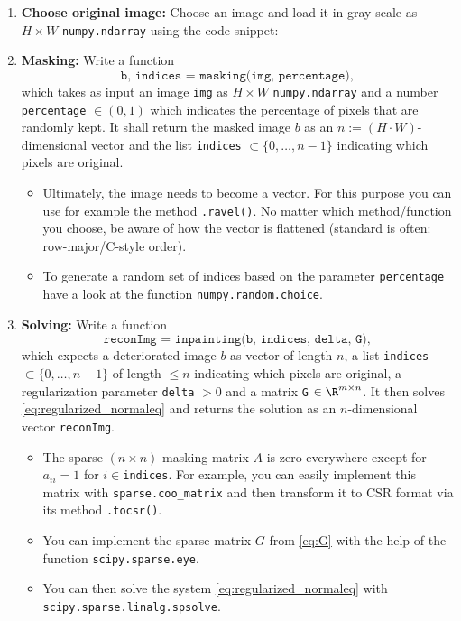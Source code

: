 \begin{enumerate}
	\item \textbf{Choose original image:} Choose an image and load it in gray-scale as $H\times W$ \texttt{numpy.ndarray} using the code snippet:
	
	\item \textbf{Masking:} Write a function 
	$$\texttt{b, indices = masking(img, percentage)},$$
	which takes as input an image \texttt{img} as $H\times W$ \texttt{numpy.ndarray} and a number \texttt{percentage} $\in (0,1)$ which indicates the percentage of pixels that are randomly kept. It shall return the masked image $b$ as an $n:=(H\cdot W)$-dimensional vector and the list \texttt{indices} $\subset \{0,\ldots, n-1\}$ indicating which pixels are original.
	\begin{itemize}
		\item Ultimately, the image needs to become a vector. For this purpose you can use for example the method \texttt{.ravel()}. No matter which method/function you choose, be aware of how the vector is flattened (standard is often: row-major/C-style order).
		\item To generate a random set of indices based on the parameter \texttt{percentage} have a look at the function \texttt{numpy.random.choice}.
	\end{itemize}
	\item \textbf{Solving:} Write a function 
	 $$\texttt{reconImg = inpainting(b, indices, delta, G)},$$
	 which expects a deteriorated image $b$ as vector of length $n$, a list \texttt{indices} $\subset \{0,\ldots, n-1\}$ of length $\leq n$ indicating which pixels are original, a regularization parameter \texttt{delta} $>0$ and a matrix \texttt{G} $\in \R^{m\times n}$. It then solves \eqref{eq:regularized_normaleq} and returns the solution as an $n$-dimensional vector \texttt{reconImg}.
	 \begin{itemize}
	 	\item The sparse  $(n \times n)$ masking matrix $A$ is zero everywhere except for $a_{ii} = 1$ for $i \in$\texttt{indices}. For example, you can easily implement this matrix with  \texttt{sparse.coo\_matrix} and then transform it to CSR format via its method \texttt{.tocsr()}.
	 	\item You can implement the sparse matrix $G$ from \eqref{eq:G} with the help of the function \texttt{scipy.sparse.eye}.
	 	\item You can then solve the system \eqref{eq:regularized_normaleq} with \texttt{scipy.sparse.linalg.spsolve}.

\end{itemize}
\end{enumerate}
